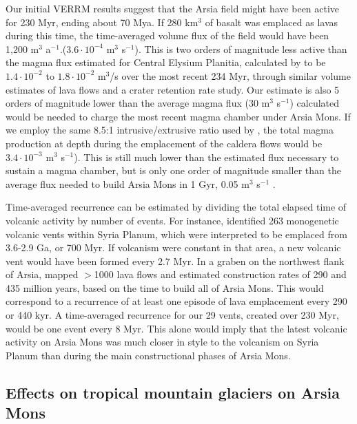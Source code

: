 \documentclass[12pt,letter]{article}
\begin{document}
Our initial VERRM results suggest that the Arsia field might have been active for 230 Myr, ending about 70 Mya. If 280 km$^3$ of basalt was emplaced as lavas during this time, the time-averaged volume flux of the field would have been 1,200 m$^3$ a$^{-1}$.($3.6\cdot 10^{-4}$ m$^3$ s$^{-1}$). This is two orders of magnitude less active than the magma flux estimated for Central Elysium Planitia, calculated by \citet{vaucher2009volcanic} to be $1.4\cdot 10^{-2}$ to $1.8\cdot 10^{-2}$ m$^3$/s over the most recent 234 Myr, through similar volume estimates of lava flows and a crater retention rate study. Our estimate is also 5 orders of magnitude lower than the average magma flux (30 m$^3$ s$^{-1}$) \citet{wilson2001evidence} calculated would be needed to charge the most recent magma chamber under Arsia Mons. If we employ the same 8.5:1 intrusive/extrusive ratio used by \citet{greeley1991magma}, the total magma production at depth during the emplacement of the caldera flows would be $3.4\cdot 10^{-3}$ m$^3$ s$^{-1}$). This is still much lower than the estimated flux necessary to sustain a magma chamber, but is only one order of magnitude smaller than the average flux needed to build Arsia Mons in 1 Gyr, 0.05 m$^3$ s$^{-1}$ \citep{wilson2001evidence}.

Time-averaged recurrence can be estimated by dividing the total elapsed time of volcanic activity by number of events. For instance, \citet{richardson2013volcanic} identified 263 monogenetic volcanic vents within Syria Planum, which were interpreted to be emplaced from 3.6-2.9 Ga, or 700 Myr. If volcanism were constant in that area, a new volcanic vent would have been formed every 2.7 Myr. In a graben on the northwest flank of Arsia, \citet{mouginis2008lava} mapped $>$1000 lava flows and estimated construction rates of 290 and 435 million years, based on the time to build all of Arsia Mons. This would correspond to a recurrence of at least one episode of lava emplacement every 290 or 440 kyr. A time-averaged recurrence for our 29 vents, created over 230 Myr, would be one event every 8 Myr. This alone would imply that the latest volcanic activity on Arsia Mons was much closer in style to the volcanism on Syria Planum than during the main constructional phases of Arsia Mons.

\subsection{Effects on tropical mountain glaciers on Arsia Mons}
\end{document}
